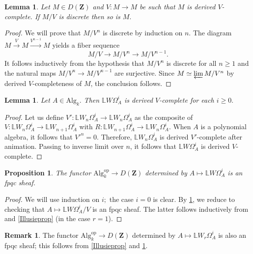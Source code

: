 \documentclass[10pt,letterpaper]{amsart}
\numberwithin{figure}{section}
\numberwithin{equation}{section}
\newtheorem{lemma}[figure]{Lemma}
\newtheorem{proposition}[figure]{Proposition}
\theoremstyle{definition}
\theoremstyle{definition}
\newtheorem{remark}[figure]{Remark}
\theoremstyle{definition}
\theoremstyle{definition}
\renewcommand{\L}{\mathbb{L}}
\newcommand{\Z}{\mathbf{Z}}
\begin{document}
\begin{lemma}\label{lemma1}
    Let $M \in D(\Z)$ and $V: M \to M$ be such that $M$ is derived $V$-complete. If $M/V$ is discrete then so is $M.$
\end{lemma}{}


\begin{proof}
We will prove that $M/V^n$ is discrete by induction on $n$.
The diagram $M \xrightarrow{V} M \xrightarrow{V^{n-1}}M $ yields a fiber sequence $$ M/V \to M/V^n \to M/V^{n-1}.$$ It follows inductively from the hypothesis that $M/V^n$ is discrete for all $n \ge 1$ and the natural maps $M/V^n \to M/V^{n-1}$ are surjective. Since $M \simeq \varprojlim M/V^n$ by derived $V$-completeness of $M$, the conclusion follows.
\end{proof}{}


\begin{lemma}\label{derV}
    Let $A \in \mathrm{Alg}_k.$ Then $\L W \Omega^i_A$ is derived $V$-complete for each $i \ge 0.$
\end{lemma}{}


\begin{proof}
    Let us define $V'\colon \L W_{n} \Omega^i_A \to \L W_{n} \Omega^i_A$ as the composite of $V\colon \L W_n\Omega^i_A \to \L W_{n+1} \Omega^i_A$ with $R\colon \L W_{n+1} \Omega^i_A \to \L W_{n} \Omega^i_A.$ When $A$ is a polynomial algebra, it follows that $V'^n=0.$ Therefore, $\L W_n \Omega^i_A$ is derived $V'$-complete after animation. Passing to inverse limit over $n$, it follows that $\L W\Omega^i_A$ is derived $V$-complete.
\end{proof}{}

\begin{proposition}\label{flatdescent} The functor $\mathrm{Alg}_k^{\mathrm{op}} \to D(\Z)$ determined by $A \mapsto \L W \Omega^i_A$ is an fpqc sheaf.
\end{proposition}{}

\begin{proof}
We will use induction on $i;$ the case $i=0$ is clear. By \cref{derV}, we reduce to checking that $A \mapsto \L W\Omega^i_A/V$ is an fpqc sheaf. The latter follows inductively from \cite[Theorem 3.1]{BMS2} and \cref{Illusieprop} (in the case $r=1$).
\end{proof}{}

\begin{remark}
    The functor $\mathrm{Alg}_k^{\mathrm{op}} \to D(\Z)$ determined by $A \mapsto \L W_r \Omega^i_A$ is also an fpqc sheaf; this follows from \cref{Illusieprop} and \cref{flatdescent}.
\end{remark}{}
\end{document}
